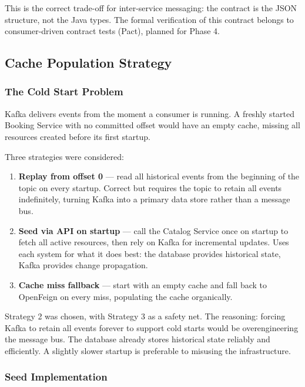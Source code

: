 This is the correct trade-off for inter-service messaging: the contract is the JSON structure, not the Java types. The formal verification of this contract belongs to consumer-driven contract tests (Pact), planned for Phase 4.

\subsection{Cache Population Strategy}

\subsubsection{The Cold Start Problem}

Kafka delivers events from the moment a consumer is running. A freshly started Booking Service with no committed offset would have an empty cache, missing all resources created before its first startup.

Three strategies were considered:

\begin{enumerate}
    \item \textbf{Replay from offset 0} --- read all historical events from the beginning of the topic on every startup. Correct but requires the topic to retain all events indefinitely, turning Kafka into a primary data store rather than a message bus.
    \item \textbf{Seed via API on startup} --- call the Catalog Service once on startup to fetch all active resources, then rely on Kafka for incremental updates. Uses each system for what it does best: the database provides historical state, Kafka provides change propagation.
    \item \textbf{Cache miss fallback} --- start with an empty cache and fall back to OpenFeign on every miss, populating the cache organically.
\end{enumerate}

Strategy 2 was chosen, with Strategy 3 as a safety net. The reasoning: forcing Kafka to retain all events forever to support cold starts would be overengineering the message bus. The database already stores historical state reliably and efficiently. A slightly slower startup is preferable to misusing the infrastructure.

\subsubsection{Seed Implementation}

